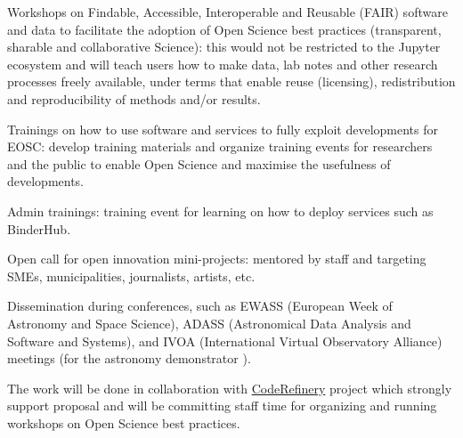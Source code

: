 \begin{task}[
  title=Training Workshops and community building,
  id=workshops,
  lead=UIO,
  PM=36,
  wphases={0-48},
  partners={CDS,EGI,EP,INSERM,QS,SIL,SRL,UPSUD,WTT,XFEL}
]
\begin{compactitem}
   \item Workshops on Findable, Accessible, Interoperable and Reusable (FAIR) software and data to facilitate the adoption of Open Science best practices (transparent, sharable and collaborative Science): this would not be restricted to the Jupyter ecosystem and will teach users how to make data, lab notes and other research processes freely available, under terms that enable reuse (licensing), redistribution and reproducibility of methods and/or results.

   \item Trainings on how to use \TheProject software and services to fully exploit \TheProject developments for EOSC: develop training materials and organize training events for researchers and the public to enable Open Science and maximise the usefulness of \TheProject developments.

   \item \TheProject Admin trainings: training event for learning on how to deploy \TheProject services such as BinderHub.


   \item Open call for open innovation mini-projects: mentored by \TheProject staff and targeting SMEs, municipalities, journalists, artists, etc.

   \item Dissemination during conferences, such as EWASS (European Week of 
         Astronomy and Space Science), ADASS (Astronomical Data Analysis and 
         Software and Systems), and IVOA (International Virtual Observatory
         Alliance) meetings (for the astronomy demonstrator 
         ).

  \end{compactitem}
 The work will be done in collaboration with \href{https://coderefinery.org}{CodeRefinery} project which strongly support \TheProject proposal and will be committing staff time for organizing and running workshops on Open Science best practices. 
\end{task}
